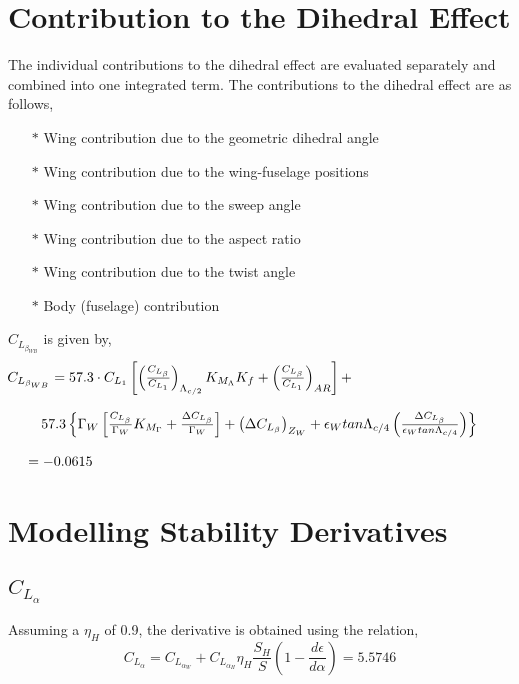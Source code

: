 \documentclass[letterpaper,12pt]{article}
\begin{document}
\section{Contribution to the Dihedral Effect}
The individual contributions to the dihedral effect are evaluated separately and combined into one integrated term. The contributions to the dihedral effect are as follows,
\begin{itemize}
\item[$\ast$] Wing contribution due to the geometric dihedral angle
\item[$\ast$] Wing contribution due to the wing-fuselage positions
\item[$\ast$] Wing contribution due to the sweep angle
\item[$\ast$] Wing contribution due to the aspect ratio
\item[$\ast$] Wing contribution due to the twist angle
\item[$\ast$] Body (fuselage) contribution
\end{itemize}
$C_{L_{\beta_{WB}}}$ is given by,
\begin{equation*}
	\begin{matrix}
\hspace*{-4cm}C_{L_{\beta_{WB}}} = 57.3\cdot C_{L_1}\left[\left(\frac{C_{L_\beta}}{C_{L_1}}\right)_{\Lambda_{c/2}}K_{M_\Lambda}K_f + \left(\frac{C_{L_\beta}}{C_{L_1}}\right)_{AR}\right] + \\ \\ 57.3\left\lbrace\Gamma_W\left[\frac{C_{L_\beta}}{\Gamma_W}K_{M_\Gamma} + \frac{\Delta  C_{L_\beta}}{\Gamma_W}\right] + \left(\Delta C_{L_\beta}\right)_{Z_W} + \epsilon_W tan\Lambda_{c/4}\left(\frac{\Delta  C_{L_\beta}}{\epsilon_W tan\Lambda_{c/4}}\right)\right\rbrace\\ \\ \hspace*{-10cm} = -0.0615
	\end{matrix}
\end{equation*}
\section{Modelling Stability Derivatives}
\subsection{$C_{L_\alpha}$}
Assuming a $\eta_H$ of 0.9, the derivative is obtained using the relation,
\begin{equation*}
C_{L_\alpha} = C_{L_{\alpha_W}} + C_{L_{\alpha_H}}\eta_H\frac{S_H}{S}\left(1 - \frac{d\epsilon}{d\alpha}\right) = 5.5746
\end{equation*}
\end{document}
